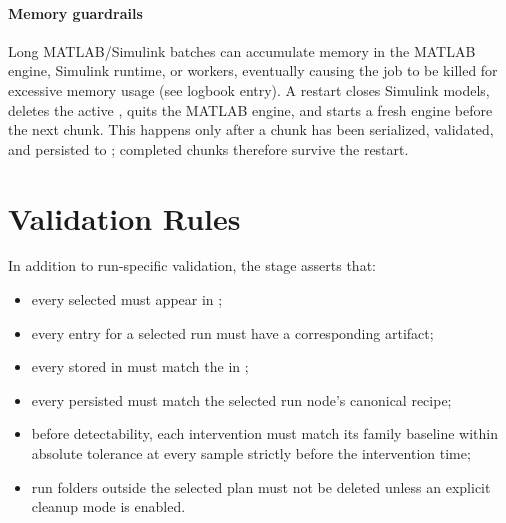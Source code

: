 \documentclass[11pt]{article}
\begin{document}
\paragraph{Memory guardrails}
Long MATLAB/Simulink batches can accumulate memory in the MATLAB engine, Simulink runtime, or  workers, eventually causing the job to be killed for excessive memory usage (see logbook entry).
A restart closes Simulink models, deletes the active , quits the MATLAB engine, and starts a fresh engine before the next chunk.
This happens only after a chunk has been serialized, validated, and persisted to ; completed chunks therefore survive the restart.

\section*{Validation Rules}

In addition to run-specific validation, the stage asserts that:

\begin{itemize}
\item every selected  must appear in ;
\item every  entry for a selected run must have a corresponding  artifact;
\item every stored  in  must match the  in ;
\item every persisted  must match the selected run node's canonical recipe;
\item before detectability, each intervention must match its family baseline within absolute tolerance  at every sample strictly before the intervention time;
\item run folders outside the selected plan must not be deleted unless an explicit cleanup mode is enabled.
\end{itemize}
\end{document}
